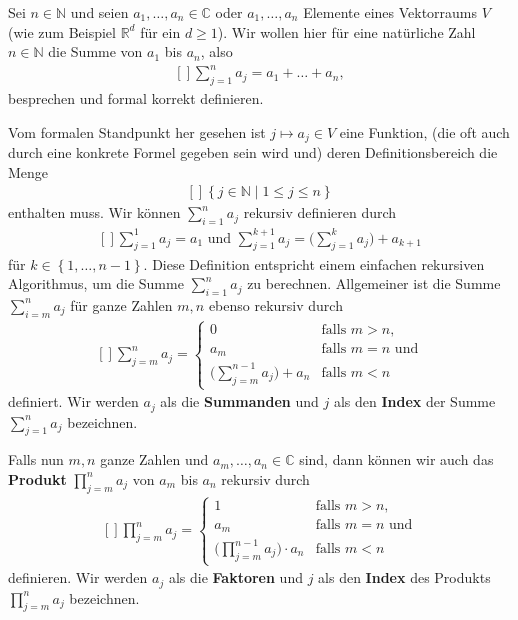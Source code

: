 \documentclass[../Analysis1_script.tex]{subfiles}
\begin{document}
Sei $n \in \mathbb {N}$ und seien $a_1,\ldots ,a_n \in \mathbb {C}$ oder $a_1,\ldots ,a_n$ Elemente eines Vektorraums $V$ (wie zum Beispiel $\mathbb {R}^d$ für ein $d \geq 1$). Wir wollen hier für eine natürliche Zahl $n\in \mathbb {N}$ die Summe von $a_1$ bis $a_n$, also
\[\begin{aligned}[]
	\sum _{j=1}^n a_j = a_1+\ldots +a_n,
\end{aligned}\]
besprechen und formal korrekt definieren.

Vom formalen Standpunkt her gesehen ist $j \mapsto a_j\in V$ eine Funktion, (die oft auch durch eine konkrete Formel gegeben sein wird und) deren Definitionsbereich die Menge
\[\begin{aligned}[]
	\left \lbrace {j \in \mathbb {N}} \mid {1 \leq j \leq n}\right \rbrace
\end{aligned}\]
enthalten muss. Wir können $\sum _{i=1}^n a_j$ rekursiv definieren durch
\[\begin{aligned}[]
	\sum _{j=1}^1 a_j = a_1\text { und } \sum _{j=1}^{k+1} a_j = \bigg (\sum _{j=1}^{k} a_j\bigg ) + a_{k+1}
\end{aligned}\]
für $k \in \left \lbrace {1,\ldots ,n-1} \right \rbrace$. Diese Definition entspricht einem einfachen rekursiven Algorithmus, um die Summe $\sum _{i=1}^n a_j$ zu berechnen. Allgemeiner ist die Summe $\sum _{i=m}^n a_j$ für ganze Zahlen $m,n$ ebenso rekursiv durch
\[\begin{aligned}[]
	\sum _{j=m}^na_j=\begin{cases}
		0 &\text {falls }m>n,\\ 
		a_m &\text {falls }m=n\text { und}\\ 
		\big (\sum _{j=m}^{n-1} a_j\big ) + a_{n}&\text {falls }m<n
	\end{cases}
\end{aligned}\]
definiert. Wir werden $a_j$ als die \textbf{Summanden} und $j$ als den \textbf{Index} der Summe $\sum _{j=1}^n a_j$ bezeichnen.  

Falls nun $m,n$ ganze Zahlen und $a_m,\ldots ,a_n \in \mathbb {C}$ sind, dann können wir auch das \textbf{Produkt} $\prod _{j=m}^n a_j$ von $a_m$ bis $a_n$ rekursiv durch
\[\begin{aligned}[]
	\prod _{j=m}^na_j=\begin{cases}
		1 &\text {falls }m>n,\\ 
		a_m &\text {falls }m=n\text { und}\\ 
		\big (\prod _{j=m}^{n-1} a_j\big ) \cdot a_{n}&\text {falls }m<n
	\end{cases}
\end{aligned}\]
definieren. Wir werden $a_j$ als die \textbf{Faktoren} und $j$ als den \textbf{Index} des Produkts $\prod _{j=m}^n a_j$ bezeichnen. 
\end{document}
